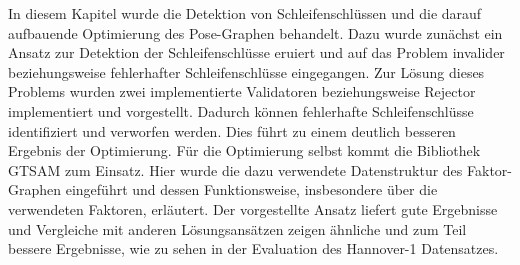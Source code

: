 In diesem Kapitel wurde die Detektion von Schleifenschlüssen und die darauf aufbauende Optimierung des Pose-Graphen behandelt. Dazu wurde zunächst ein Ansatz zur Detektion der Schleifenschlüsse eruiert und auf das Problem invalider beziehungsweise fehlerhafter Schleifenschlüsse eingegangen. Zur Lösung dieses Problems wurden zwei implementierte Validatoren beziehungsweise Rejector implementiert und vorgestellt. Dadurch können fehlerhafte Schleifenschlüsse identifiziert und verworfen werden. Dies führt zu einem deutlich besseren Ergebnis der Optimierung. Für die Optimierung selbst kommt die Bibliothek GTSAM zum Einsatz. Hier wurde die dazu verwendete Datenstruktur des Faktor-Graphen eingeführt und dessen Funktionsweise, insbesondere über die verwendeten Faktoren, erläutert. Der vorgestellte Ansatz liefert gute Ergebnisse und Vergleiche mit anderen Lösungsansätzen zeigen ähnliche und zum Teil bessere Ergebnisse, wie zu sehen in der Evaluation des Hannover-1 Datensatzes.








